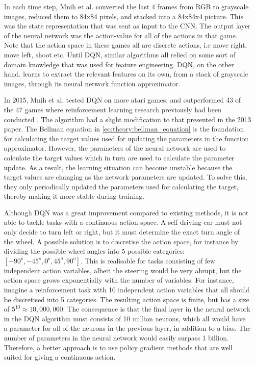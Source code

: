 \documentclass[class=book, crop=false]{standalone}
\begin{document}
In each time step, Mnih et al. converted the last 4 frames from RGB to grayscale images, reduced them to 84x84 pixels, and stacked into a 84x84x4 picture. This was the state representation that was sent as input to the CNN. The output layer of the neural network was the action-value for all of the actions in that game. Note that the action space in these games all are discrete actions, i.e move right, move left, shoot etc. Until DQN, similar algorithms all relied on some sort of domain knowledge that was used for feature engineering. DQN, on the other hand, learns to extract the relevant features on its own, from a stack of grayscale images, through its neural network function approximator.

In 2015, Mnih et al. tested DQN on more atari games, and outperformed 43 of the 47 games where reinforcement learning research previously had been conducted \cite{mnih2015_humanlevel}. The algorithm had a slight modification to that presented in the 2013 paper. The Bellman equation in \eqref{eq:theory:bellman_equation} is the foundation for calculating the target values used for updating the parameters in the function approximator. However, the parameters of the neural network are used to calculate the target values which in turn are used to calculate the parameter update. As a result, the learning situation can become unstable because the target values are changing as the network parameters are updated. To solve this, they only periodically updated the parameters used for calculating the target, thereby making it more stable during training. 


Although DQN was a great improvement compared to existing methods, it is not able to tackle tasks with a continuous action space. A self-driving car must not only decide to turn left or right, but it must determine the exact turn angle of the wheel. A possible solution is to discretise the action space, for instance by dividing the possible wheel angles into 5 possible categories: $[-90^{o},-45^{o},0^{o},45^{o},90^{o}]$. This is realisable for tasks consisting of few independent action variables, albeit the steering would be very abrupt, but the action space grows exponentially with the number of variables. For instance, imagine a reinforcement task with 10 independent action variables that all should be discretised into 5 categories. The resulting action space is finite, but has a size of $5^{10} \approx 10, 000,000$. The consequence is that the final layer in the neural network in the DQN algorithm must consists of 10 million neurons, which all would have a parameter for all of the neurons in the previous layer, in addition to a bias. The number of parameters in the neural network would easily surpass 1 billion. Therefore, a better approach is to use policy gradient methods that are well suited for giving a continuous action. 
\end{document}
